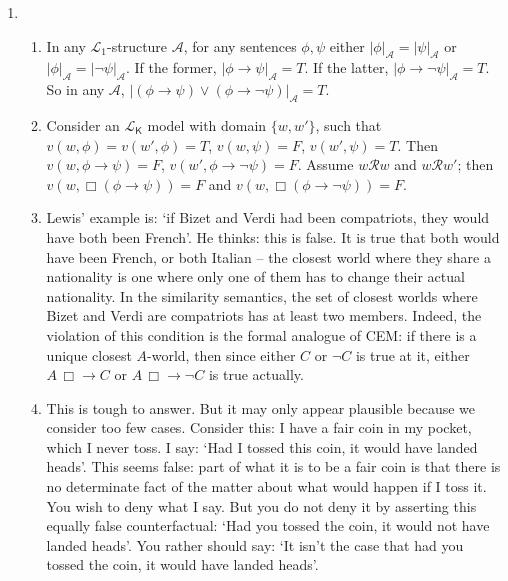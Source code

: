 {{\begin{enumerate}
\begin{enumerate}
It is easy to draw similarity spheres which represent these situations in Lewis' semantics. They have to have the closest $A$-world be a $C$-world, but the closest $¬C$-world \emph{still} be an $A$-world.
\item Suppose $\Box(\phi\to\psi)$ holds at $w$, but $v(w,\Box(¬\psi\to ¬\phi))=F$. Then there is an accessible world $w'$ such that $v(w',¬\psi\to ¬\phi)=F$, so $v(w',¬\psi)=T$ and $v(w',¬\phi)=F$, so that $v(w',\psi)=F$ and $v(w',\phi)=T$. But then $v(w',\phi\to\psi)=F$, hence $v(w,\Box(\phi\to\psi))=F$, contradiction. So there is no such $w$; contraposition for the strict conditional is valid in any logic extending $\mathscr{L}_{\mathsf{K}}$.
\end{enumerate}
\item \begin{enumerate}
	\item In any $\mathscr{L}_{1}$-structure $\mathscr{A}$, for any sentences $\phi,\psi$ either $|\phi|_{\mathscr{A}} = |\psi|_{\mathscr{A}}$ or $|\phi|_{\mathscr{A}} = |¬\psi|_{\mathscr{A}}$. If the former, $|\phi\to\psi|_{\mathscr{A}} = T$. If the latter, $|\phi\to ¬\psi|_{\mathscr{A}} = T$. So in any $\mathscr{A}$, $|(\phi\to\psi)\vee(\phi\to ¬\psi)|_{\mathscr{A}} = T$.
	\item Consider an $\mathscr{L}_{\mathsf{K}}$ model with domain $\{w,w'\}$, such that $v(w,\phi)=v(w',\phi)=T$, $v(w,\psi)=F$, $v(w',\psi)=T$. Then $v(w,\phi\to\psi)=F$, $v(w',\phi\to ¬\psi)=F$. Assume $w\mathscr{R}w$ and $w\mathscr{R}w'$; then $v(w,\Box(\phi\to\psi))=F$ and $v(w,\Box(\phi\to ¬\psi))=F$.
	\item Lewis' example is: `if Bizet and Verdi had been compatriots, they would have both been French'. He thinks: this is false. It is true that both would have been French, or both Italian – the closest world where they share a nationality is one where only one of them has to change their actual nationality. In the similarity semantics, the set of closest worlds where Bizet and Verdi are compatriots has at least two members. Indeed, the violation of this condition is the formal analogue of CEM: if there is a unique closest $A$-world, then since either $C$ or $¬C$ is true at it, either $A\, \Box\!\!\rightarrow C$ or $A\, \Box\!\!\rightarrow ¬C$ is true actually.
	\item This is tough to answer. But it may only appear plausible because we consider too few cases. Consider this: I have a fair coin in my pocket, which I never toss. I say: `Had I tossed this coin, it would have landed heads'. This seems false: part of what it is to be a fair coin is that there is no determinate fact of the matter about what would happen if I toss it. You wish to deny what I say. But you do not deny it by asserting this equally false counterfactual: `Had you tossed the coin, it would not have landed heads'. You rather should say: `It isn't the case that had you tossed the coin, it would have landed heads'.
	

\end{enumerate}
\end{enumerate}}}
